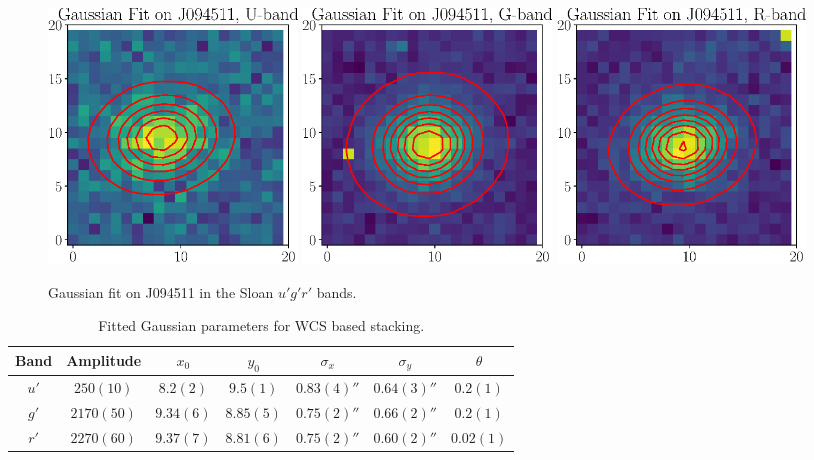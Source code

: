 \documentclass[a4paper,11pt]{article}
\begin{document}
\begin{figure}[t]
    \includegraphics[width=0.32\textwidth]{gauss_fit_wcs_U_stack.eps}
    \includegraphics[width=0.32\textwidth]{gauss_fit_wcs_G_stack.eps}
    \includegraphics[width=0.32\textwidth]{gauss_fit_wcs_R_stack.eps}
    \caption{Gaussian fit on J094511 in the Sloan $u'g'r'$ bands.}
    \label{fig:gauss_fit_wcs_stack}
\end{figure}

\begin{table}[h!]
    \centering
    \begin{tabular}{| c | c | c | c | c | c | c |} \hline
        Band & Amplitude & $x_0$ & $y_0$ & $\sigma_x$ & $\sigma_y$ & $\theta$ \\ \hline \hline
        $u'$ & $250(10)$ & $8.2(2)$ & $9.5(1)$ & $0.83(4)''$ & $0.64(3)''$ & $0.2(1)$ \\
        $g'$ & $2170(50)$ & $9.34(6)$ & $8.85(5)$ & $0.75(2)''$ & $0.66(2)''$ & $0.2(1)$  \\
        $r'$ & $2270(60)$ & $9.37(7)$ & $8.81(6)$ & $0.75(2)''$ & $0.60(2)''$ & $0.02(1)$ \\ \hline
    \end{tabular}
    \caption{Fitted Gaussian parameters for WCS based stacking.}
    \label{tab:wcs_gaussians}
\end{table}
\end{document}
